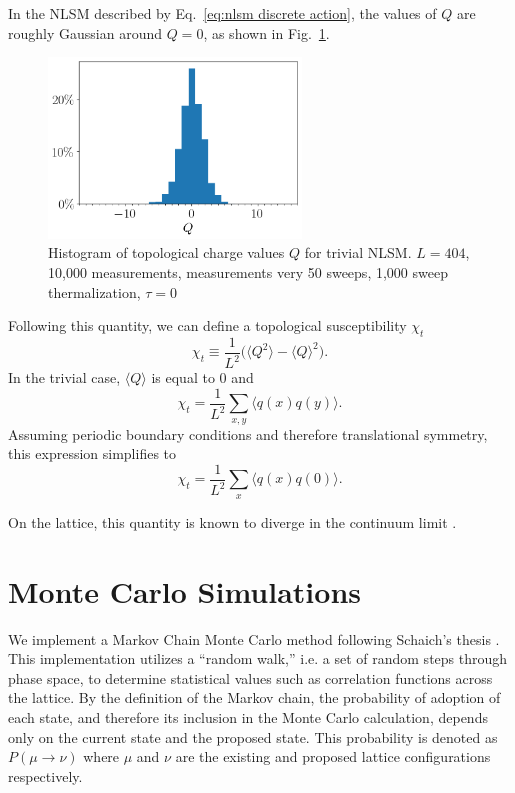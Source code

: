 In the NLSM described by Eq.~\ref{eq:nlsm discrete action}, the values of $Q$ are roughly Gaussian around $Q=0$, as shown in Fig.~\ref{fig:hist}.
\begin{figure}[h]
    \centering
      \includegraphics[width=0.6\textwidth]{imgs/hist.png}
      \caption{\label{fig:hist} Histogram of topological charge values $Q$ for trivial NLSM. $L=404$, 10,000 measurements, measurements very 50 sweeps, 1,000 sweep thermalization, $\tau=0$}
\end{figure}

Following this quantity, we can define a topological susceptibility $\chi_t$
\begin{equation}
\chi_t \equiv \frac{1}{L^2} \Big( \langle Q^2 \rangle - \langle Q \rangle^2 \Big).
\end{equation}
In the trivial case, $\langle Q \rangle$ is equal to $0$ and   
\begin{equation}
    \chi_t = \frac{1}{L^2} \sum_{x,y} \langle q(x)q(y)\rangle.
\end{equation}
Assuming periodic boundary conditions and therefore translational symmetry, this expression simplifies to 
\begin{equation}
    \chi_t = \frac{1}{L^2} \sum_{x} \langle q(x)q(0)\rangle.
\end{equation}

On the lattice, this quantity is known to diverge in the continuum limit \cite{bietenholz2018}. %


\section{Monte Carlo Simulations}
\label{sec:mc}
We implement a Markov Chain Monte Carlo method following Schaich's thesis \cite{schaich2006}. This implementation utilizes a ``random walk,'' i.e. a set of random steps through phase space, to determine statistical values such as correlation functions across the lattice. By the definition of the Markov chain, the probability of adoption of each state, and therefore its inclusion in the Monte Carlo calculation, depends only on the current state and the proposed state. This probability is denoted as $P(\mu\rightarrow\nu)$ where $\mu$ and $\nu$ are the existing and proposed lattice configurations respectively.

